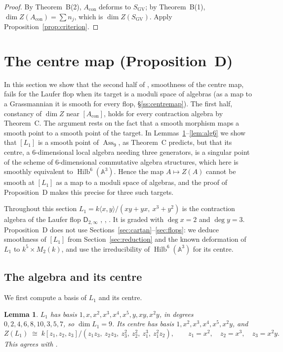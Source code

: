 \documentclass[11pt]{amsart}
\numberwithin{table}{section}
\numberwithin{figure}{section}
\numberwithin{equation}{section}
\newtheorem{lem}[thm]{Lemma}
\theoremstyle{definition}
\theoremstyle{plain}
\newcommand{\Acon}{A_{\mathrm{con}}}
\newcommand{\SGV}{S_{\mathrm{GV}}}
\newcommand{\A}{\mathbb{A}}
\DeclareMathOperator{\Hilb}{Hilb}
\DeclareMathOperator{\Ass}{Ass}
\begin{document}
\begin{proof}
By Theorem~B(2), $\Acon$ deforms to $\SGV$; by Theorem~B(1), $\dim Z(\Acon) = \sum n_j$, which is $\dim Z(\SGV)$. Apply Proposition~\ref{prop:criterion}.
\end{proof}


%
\section{\texorpdfstring{The centre map (Proposition~D)}{The centre map (Proposition D)}}\label{sec:centremap}

In this section we show that the second half of \cite[Conj~1.4(2)]{JS}, smoothness of the centre map, fails for the Laufer flop when its target is a moduli space of algebras (as a map to a Grassmannian it is smooth for every flop, \S\ref{ss:centremap}). The first half, constancy of $\dim Z$ near $[\Acon]$, holds for every contraction algebra by Theorem~C. The argument rests on the fact that a smooth morphism maps a smooth point to a smooth point of the target. In Lemmas~\ref{lem:laufer}--\ref{lem:alg6} we show that $[L_1]$ is a smooth point of $\Ass_9$, as Theorem~C predicts, but that its centre, a $6$-dimensional local algebra needing three generators, is a singular point of the scheme of $6$-dimensional commutative algebra structures, which here is smoothly equivalent to $\Hilb^6(\A^3)$. Hence the map $A \mapsto Z(A)$ cannot be smooth at $[L_1]$ as a map to a moduli space of algebras, and the proof of Proposition~D makes this precise for three such targets.

Throughout this section $L_1 = k\langle x,y\rangle/(xy + yx,\ x^3 + y^2)$ is the contraction algebra of the Laufer flop $\mathsf{D}_{2,\infty}$ \cite[Example~1.3]{DW}, \cite[\S\S4.2, 4.4]{AM}, \cite[Example~5.2]{K}. It is graded with $\deg x = 2$ and $\deg y = 3$. Proposition~D does not use Sections~\ref{sec:cartan}--\ref{sec:flops}: we deduce smoothness of $[L_1]$ from Section~\ref{sec:reduction} and the known deformation of $L_1$ to $k^5 \times M_2(k)$, and use the irreducibility of $\Hilb^6(\A^3)$ for its centre.

\subsection{The algebra and its centre}

We first compute a basis of $L_1$ and its centre.

\begin{lem}\label{lem:laufer}
$L_1$ has basis $1, x, x^2, x^3, x^4, x^5, y, xy, x^2y$, in degrees $0, 2, 4, 6, 8, 10, 3, 5, 7$, so $\dim L_1 = 9$. Its centre has basis $1, x^2, x^3, x^4, x^5, x^2y$, and
\[
Z(L_1) \;\cong\; k[z_1,z_2,z_3]/(z_1z_3,\ z_2z_3,\ z_3^2,\ z_2^2,\ z_1^3,\ z_1^2z_2), \qquad z_1 = x^2,\quad z_2 = x^3,\quad z_3 = x^2y .
\]
This agrees with \cite[Prop~3.3]{JS}.
\end{lem}
\end{document}
